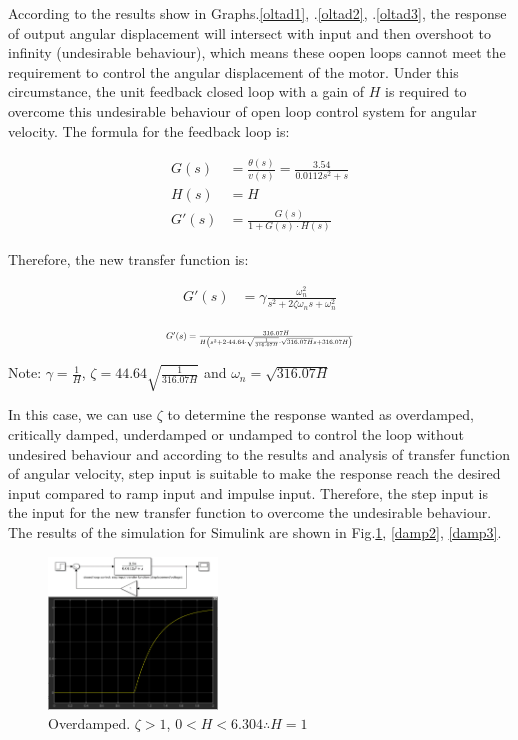 \documentclass[conference]{IEEEtran}
\begin{document}
According to the results show in Graphs.\ref{oltad1}, .\ref{oltad2}, .\ref{oltad3}, the response of output angular displacement will intersect with input and then overshoot to infinity (undesirable behaviour), which means these oopen loops cannot meet the requirement to control the angular displacement of the motor. Under this circumstance, the unit feedback closed loop with a gain of $H$ is required to overcome this undesirable behaviour of open loop control system for angular velocity. The formula for the feedback loop is:

\begin{align}
    G(s) &= \frac{\theta (s)}{v(s)} = \frac{3.54}{0.0112s^2 + s}\\
    H(s) &= H\\
    G'(s) &= \frac{G(s)}{1 + G(s) \cdot H(s)}
\end{align}

Therefore, the new transfer function is:

\begin{align}
    G'(s) &= \gamma \frac{\omega_n^2}{s^2 + 2\zeta \omega_n s + \omega_n^2}
\end{align}

\begin{align}
    \resizebox{.4 \textwidth}{!}
    {$
    G'(s) = \frac{316.07H}{H\left( s^2 + 2 \cdot 44.64 \cdot \sqrt{\frac{1}{316.07H}} \cdot \sqrt{316.07 H} s + 316.07 H\right)}
    $}
\end{align}

Note: $\gamma = \frac{1}{H}$, $\zeta = 44.64 \sqrt{\frac{1}{316.07H}}$ and $\omega_n = \sqrt{316.07H}$

In this case, we can use $\zeta$ to determine the response wanted as overdamped, critically damped, underdamped or undamped to control the loop without undesired behaviour and according to the results and analysis of transfer function of angular velocity, step input is suitable to make the response reach the desired input compared to ramp input and impulse input. Therefore, the step input is the input for the new transfer function to overcome the undesirable behaviour. The results of the simulation for Simulink are shown in Fig.\ref{damp1}, \ref{damp2}, \ref{damp3}. 

\begin{figure}[htbp]
    \centerline{\includegraphics[width = 0.4\textwidth]{../img/q1-11.png}}
    \caption{Overdamped. $\zeta > 1$, $0 < H < 6.304 \therefore H = 1$}
    \label{damp1}
\end{figure}
\end{document}
